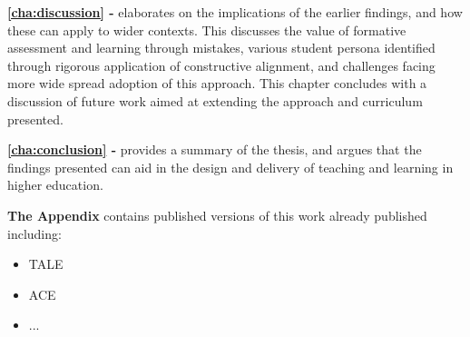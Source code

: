 

\textbf{\cref{cha:discussion} - } elaborates on the implications of the earlier findings, and how these can apply to wider contexts. This discusses the value of formative assessment and learning through mistakes, various student persona identified through rigorous application of constructive alignment, and challenges facing more wide spread adoption of this approach. This chapter concludes with a discussion of future work aimed at extending the approach and curriculum presented.

\textbf{\cref{cha:conclusion} - } provides a summary of the thesis, and argues that the findings presented can aid in the design and delivery of teaching and learning in higher education. 

\textbf{The Appendix} contains published versions of this work already published including:
\begin{itemize}
	\item TALE
	\item ACE
	\item ...
\end{itemize}




